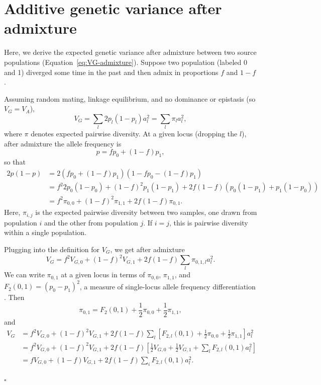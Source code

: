 \documentclass{article}
\begin{document}
\section{Additive genetic variance after admixture}\label{sec:VG-admixture}

Here, we derive the expected genetic variance after admixture between two
source populations (Equation~\ref{eq:VG-admixture}). Suppose two population
(labeled 0 and 1) diverged some time in the past and then admix in proportions
$f$ and $1-f$.

Assuming random mating, linkage equilibrium, and no dominance or epistasis
(so \(V_G=V_A\)),
\[V_G = \sum_l 2p_l(1-p_l)a_l^2 = \sum_l \pi_l a_l^2,\]
where $\pi$ denotes expected pairwise diversity.
At a given locus (dropping the $l$), after admixture the allele frequency is
\[p=f p_0 + (1-f) p_1,\]
so that
\begin{align*}
    2p(1-p) & = 2(f p_0 + (1-f) p_1)(1 - f p_0 - (1-f) p_1) \\
    & = f^2 2p_0(1-p_0) + (1-f)^2 p_1(1-p_1) + 2f(1-f) (p_0(1-p_1) + p_1(1-p_0)) \\
    & = f^2 \pi_{0,0} + (1-f)^2 \pi_{1,1} + 2f(1-f)\pi_{0,1}.
\end{align*}
Here, $\pi_{i,j}$ is the expected pairwise diversity between two samples, one
drawn from population $i$ and the other from population $j$. If $i=j$, this is
pairwise diversity within a single population.

Plugging into the definition for $V_G$, we get after admixture
\[V_G = f^2 V_{G,0} + (1-f)^2 V_{G,1} + 2f(1-f)\sum_l \pi_{0,1,l}a_l^2.\]
We can write $\pi_{0,1}$ at a given locus in terms of $\pi_{0,0}$, $\pi_{1,1}$,
and $F_2(0,1)=(p_0-p_1)^2$, a measure of single-locus allele frequency
differentiation \citep{peter2016admixture}. Then
\[\pi_{0,1} = F_2(0,1) + \frac{1}{2}\pi_{0,0} + \frac{1}{2}\pi_{1,1},\]
and
\begin{align*}
    V_G & = f^2 V_{G,0} + (1-f)^2 V_{G,1} + 2f(1-f)\sum_l \left[F_{2,l}(0,1)
    + \frac{1}{2}\pi_{0,0} + \frac{1}{2}\pi_{1,1}\right] a_l^2 \\
    & = f^2 V_{G,0} + (1-f)^2 V_{G,1} + 2f(1-f)\left[\frac{1}{2}V_{G,0} 
    + \frac{1}{2}V_{G,1} + \sum_l F_{2,l}(0,1)a_l^2\right] \\
    & = f V_{G,0} + (1-f)V_{G,1} + 2f(1-f)\sum_i F_{2,l}(0,1)a_l^2.
\end{align*}

\hfill$\square$
\end{document}
